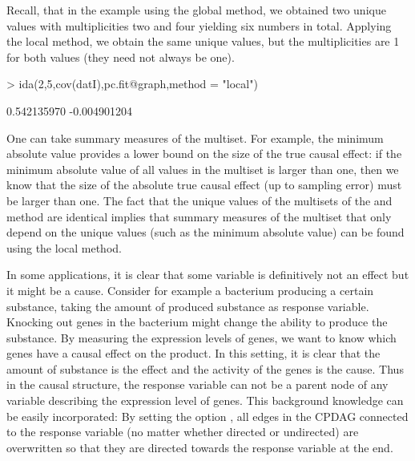 \documentclass[article]{jss}
\begin{document}
Recall, that in the example using the global method, we obtained two unique
values with multiplicities two and four yielding six numbers in total.
Applying the local method, we obtain the same unique values, but the
multiplicities are 1 for both values (they need not always be one).

\begin{Schunk}
\begin{Sinput}
> ida(2,5,cov(datI),pc.fit@graph,method = "local")
\end{Sinput}
\begin{Soutput}
[1]  0.542135970 -0.004901204
\end{Soutput}
\end{Schunk}

One can take summary measures of the multiset. For example, the minimum
absolute value provides a lower bound on the size of the true causal
effect: if the minimum absolute value of all values in the multiset is
larger than one, then we know that the size of the absolute true causal
effect (up to sampling error) must be larger than one. The fact that the
unique values of the multisets of the  and 
method are identical implies that summary measures of the multiset that
only depend on the unique values (such as the minimum absolute value) can
be found using the local method.

In some applications, it is clear that some variable is definitively not an
effect but it might be a cause. Consider for example a bacterium producing
a certain substance, taking the amount of produced substance as response
variable. Knocking out genes in the bacterium might change the ability to
produce the substance. By measuring the expression levels of genes, we want
to know which genes have a causal effect on the product. In this setting,
it is clear that the amount of substance is the effect and the activity of
the genes is the cause. Thus in the causal structure, the response variable
can not be a parent node of any variable describing the expression level of
genes. This background knowledge can be easily incorporated: By setting the
option , all edges in the CPDAG connected to the
response variable (no matter whether directed or undirected) are overwritten so
that they are directed towards the response variable at the end.
\end{document}
